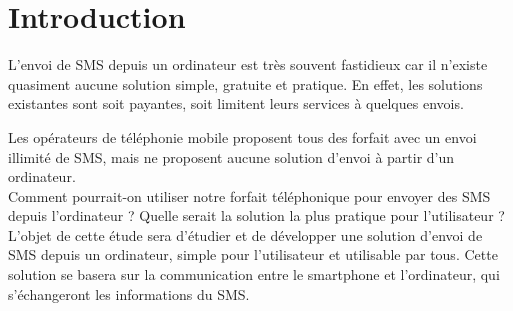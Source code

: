 \cleardoublepage



\chapter*{Introduction}


L'envoi de SMS depuis un ordinateur est très souvent fastidieux car il n'existe quasiment aucune solution simple, gratuite et pratique.
En effet, les solutions existantes sont soit payantes, soit limitent leurs services à quelques envois.

Les opérateurs de téléphonie mobile proposent tous des forfait avec un envoi illimité de SMS, mais ne proposent aucune solution d'envoi à partir d'un ordinateur.
\\




Comment pourrait-on utiliser notre forfait téléphonique pour envoyer des SMS depuis l'ordinateur ?
Quelle serait la solution la plus pratique pour l'utilisateur ?
\\




L'objet de cette étude sera d'étudier et de développer une solution d'envoi de SMS depuis un ordinateur, simple pour l'utilisateur et utilisable par tous.
Cette solution se basera sur la communication entre le smartphone et l'ordinateur, qui s'échangeront les informations du SMS.
\\



